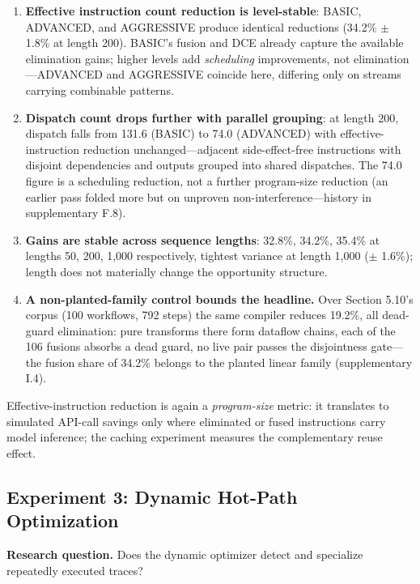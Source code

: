 \documentclass[
  sigconf,
  anonymous]{acmart}
\begin{document}
\begin{enumerate}
\def\labelenumi{\arabic{enumi}.}
\item
  \textbf{Effective instruction count reduction is level-stable}: BASIC,
  ADVANCED, and AGGRESSIVE produce identical reductions (34.2\% \(\pm\)
  1.8\% at length 200). BASIC's fusion and DCE already capture the
  available elimination gains; higher levels add \emph{scheduling}
  improvements, not elimination---ADVANCED and AGGRESSIVE coincide here,
  differing only on streams carrying combinable patterns.
\item
  \textbf{Dispatch count drops further with parallel grouping}: at
  length 200, dispatch falls from 131.6 (BASIC) to 74.0 (ADVANCED) with
  effective-instruction reduction unchanged---adjacent side-effect-free
  instructions with disjoint dependencies and outputs grouped into
  shared dispatches. The 74.0 figure is a scheduling reduction, not a
  further program-size reduction (an earlier pass folded more but on
  unproven non-interference---history in supplementary F.8).
\item
  \textbf{Gains are stable across sequence lengths}: 32.8\%, 34.2\%,
  35.4\% at lengths 50, 200, 1,000 respectively, tightest variance at
  length 1,000 (\(\pm\) 1.6\%); length does not materially change the
  opportunity structure.
\item
  \textbf{A non-planted-family control bounds the headline.} Over
  Section 5.10's corpus (100 workflows, 792 steps) the same compiler
  reduces 19.2\%, all dead-guard elimination: pure transforms there form
  dataflow chains, each of the 106 fusions absorbs a dead guard, no live
  pair passes the disjointness gate---the fusion share of 34.2\% belongs
  to the planted linear family (supplementary I.4).
\end{enumerate}

Effective-instruction reduction is again a \emph{program-size} metric:
it translates to simulated API-call savings only where eliminated or
fused instructions carry model inference; the caching experiment
measures the complementary reuse effect.

\subsection{Experiment 3: Dynamic Hot-Path
Optimization}\label{experiment-3-dynamic-hot-path-optimization}

\textbf{Research question.} Does the dynamic optimizer detect and
specialize repeatedly executed traces?
\end{document}
